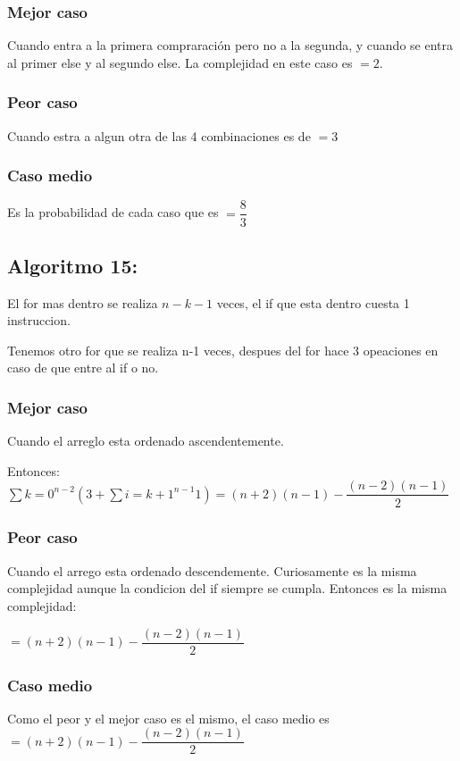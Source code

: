 \documentclass[12pt, fleqn]{article}                             %
\theoremstyle{break}                                            %
\begin{document}
    \subsubsection{Mejor caso}
    Cuando entra a la primera compraración pero no a la segunda, y cuando se entra al primer else y al segundo else.
    La complejidad en este caso es $=2$.
    \subsubsection{Peor caso}
    Cuando estra a algun otra de las 4 combinaciones es de $=3$

    \subsubsection{Caso medio}
    Es la probabilidad de cada caso que es $=\dfrac{8}{3}$

    \subsection{Algoritmo 15:}
    
    El for mas dentro se realiza $n-k-1$ veces, el if que esta dentro cuesta 1 instruccion.

    Tenemos  otro for que se realiza n-1 veces, despues del for hace 3 opeaciones 
en caso de que entre al if o no.

    \subsubsection{Mejor caso}
    Cuando el arreglo esta ordenado ascendentemente.

    Entonces: $\sum{k=0}^{n-2}(3+\sum{i=k+1}^{n-1}1)=(n+2)(n-1)-\dfrac{(n-2)(n-1)}{2}$
    \subsubsection{Peor caso}
    Cuando el arrego esta ordenado descendemente.
    Curiosamente es la misma complejidad aunque la condicion del if siempre se cumpla.
    Entonces es la misma complejidad:

    $=(n+2)(n-1)-\dfrac{(n-2)(n-1)}{2}$

    \subsubsection{Caso medio}
    Como el peor y el mejor caso es el mismo, el caso medio es $=(n+2)(n-1)-\dfrac{(n-2)(n-1)}{2}$







    

\end{document}
